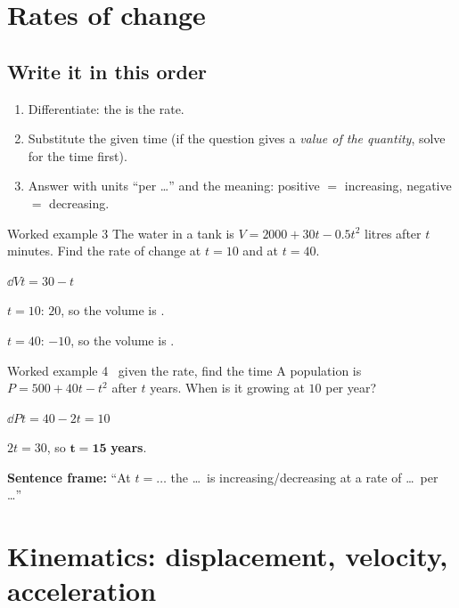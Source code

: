 \documentclass[11pt]{article}
\newlength\figunit
\begin{document}
\section{Rates of change}\label{rates}
\subsection{Write it in this order}
\begin{enumerate}[leftmargin=7mm, itemsep=1pt]
\item Differentiate: the \tderiv is the rate.
\item Substitute the given time (if the question gives a \emph{value of the quantity}, solve for the time first).
\item Answer with units ``per \dots'' and the meaning: positive $=$ increasing, negative $=$ decreasing.
\end{enumerate}

\begin{example}{Worked example 3}
The water in a tank is $V=2000+30t-0.5t^{2}$ litres after $t$ minutes. Find the rate of change at $t=10$ and at $t=40$.
\begin{steps}
\item $\dd{V}{t}=30-t$
\item $t=10$: $20$, so the volume is .
\item $t=40$: $-10$, so the volume is .
\end{steps}
\end{example}

\begin{example}{Worked example 4 \textperiodcentered\ given the rate, find the time}
A population is $P=500+40t-t^{2}$ after $t$ years. When is it growing at $10$ per year?
\begin{steps}
\item $\dd{P}{t}=40-2t=10$
\item $2t=30$, so $\mathbf{t=15}$ \textbf{years}.
\end{steps}
\end{example}

\textbf{Sentence frame:} ``At $t=\dots$ the \dots\ is increasing/decreasing at a rate of \dots\ per \dots''

\section{Kinematics: displacement, velocity, acceleration}\label{kin}
\begin{center}
\setlength\figunit{9mm}

\end{center}
\end{document}
